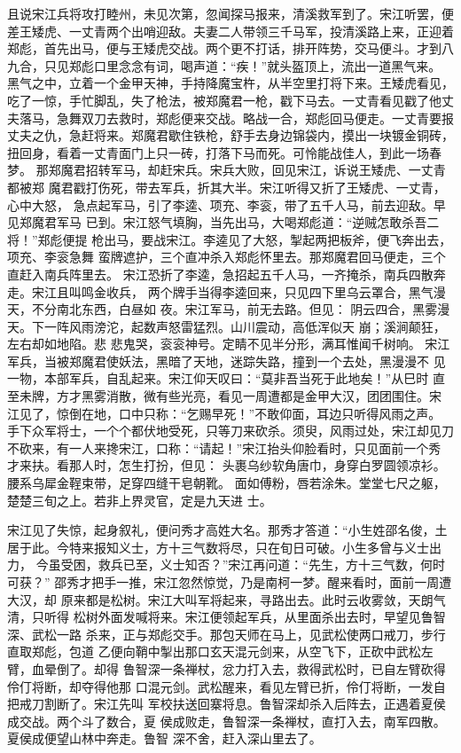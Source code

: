 且说宋江兵将攻打睦州，未见次第，忽闻探马报来，清溪救军到了。宋江听罢，便
差王矮虎、一丈青两个出哨迎敌。夫妻二人带领三千马军，投清溪路上来，正迎着
郑彪，首先出马，便与王矮虎交战。两个更不打话，排开阵势，交马便斗。才到八
九合，只见郑彪口里念念有词，喝声道：“疾！”就头盔顶上，流出一道黑气来。
黑气之中，立着一个金甲天神，手持降魔宝杵，从半空里打将下来。王矮虎看见，
吃了一惊，手忙脚乱，失了枪法，被郑魔君一枪，戳下马去。一丈青看见戳了他丈
夫落马，急舞双刀去救时，郑彪便来交战。略战一合，郑彪回马便走。一丈青要报
丈夫之仇，急赶将来。郑魔君歇住铁枪，舒手去身边锦袋内，摸出一块镀金铜砖，
扭回身，看着一丈青面门上只一砖，打落下马而死。可怜能战佳人，到此一场春梦。
那郑魔君招转军马，却赶宋兵。宋兵大败，回见宋江，诉说王矮虎、一丈青都被郑
魔君戳打伤死，带去军兵，折其大半。宋江听得又折了王矮虎、一丈青，心中大怒，
急点起军马，引了李逵、项充、李衮，带了五千人马，前去迎敌。早见郑魔君军马
已到。宋江怒气填胸，当先出马，大喝郑彪道：“逆贼怎敢杀吾二将！”郑彪便提
枪出马，要战宋江。李逵见了大怒，掣起两把板斧，便飞奔出去，项充、李衮急舞
蛮牌遮护，三个直冲杀入郑彪怀里去。那郑魔君回马便走，三个直赶入南兵阵里去。
宋江恐折了李逵，急招起五千人马，一齐掩杀，南兵四散奔走。宋江且叫鸣金收兵，
两个牌手当得李逵回来，只见四下里乌云罩合，黑气漫天，不分南北东西，白昼如
夜。宋江军马，前无去路。但见：
阴云四合，黑雾漫天。下一阵风雨滂沱，起数声怒雷猛烈。山川震动，高低浑似天
崩；溪涧颠狂，左右却如地陷。悲
悲鬼哭，衮衮神号。定睛不见半分形，满耳惟闻千树响。
宋江军兵，当被郑魔君使妖法，黑暗了天地，迷踪失路，撞到一个去处，黑漫漫不
见一物，本部军兵，自乱起来。宋江仰天叹曰：“莫非吾当死于此地矣！”从巳时
直至未牌，方才黑雾消散，微有些光亮，看见一周遭都是金甲大汉，团团围住。宋
江见了，惊倒在地，口中只称：“乞赐早死！”不敢仰面，耳边只听得风雨之声。
手下众军将士，一个个都伏地受死，只等刀来砍杀。须臾，风雨过处，宋江却见刀
不砍来，有一人来搀宋江，口称：“请起！”宋江抬头仰脸看时，只见面前一个秀
才来扶。看那人时，怎生打扮，但见：
头裹乌纱软角唐巾，身穿白罗圆领凉衫。腰系乌犀金鞓束带，足穿四缝干皂朝靴。
面如傅粉，唇若涂朱。堂堂七尺之躯，楚楚三旬之上。若非上界灵官，定是九天进
士。

宋江见了失惊，起身叙礼，便问秀才高姓大名。那秀才答道：“小生姓邵名俊，土
居于此。今特来报知义士，方十三气数将尽，只在旬日可破。小生多曾与义士出力，
今虽受困，救兵已至，义士知否？”宋江再问道：“先生，方十三气数，何时可获？”
邵秀才把手一推，宋江忽然惊觉，乃是南柯一梦。醒来看时，面前一周遭大汉，却
原来都是松树。宋江大叫军将起来，寻路出去。此时云收雾敛，天朗气清，只听得
松树外面发喊将来。宋江便领起军兵，从里面杀出去时，早望见鲁智深、武松一路
杀来，正与郑彪交手。那包天师在马上，见武松使两口戒刀，步行直取郑彪，包道
乙便向鞘中掣出那口玄天混元剑来，从空飞下，正砍中武松左臂，血晕倒了。却得
鲁智深一条禅杖，忿力打入去，救得武松时，已自左臂砍得伶仃将断，却夺得他那
口混元剑。武松醒来，看见左臂已折，伶仃将断，一发自把戒刀割断了。宋江先叫
军校扶送回寨将息。鲁智深却杀入后阵去，正遇着夏侯成交战。两个斗了数合，夏
侯成败走，鲁智深一条禅杖，直打入去，南军四散。夏侯成便望山林中奔走。鲁智
深不舍，赶入深山里去了。

